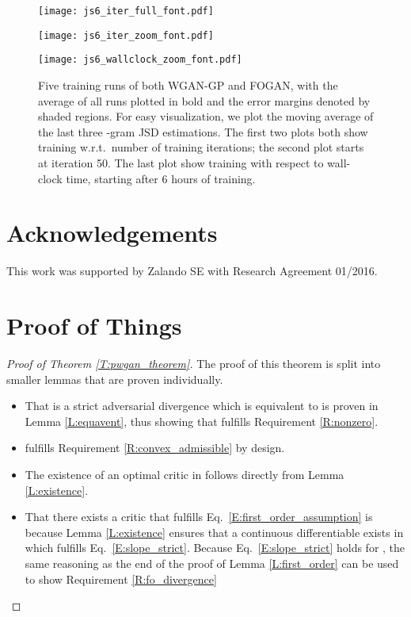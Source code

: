 \documentclass{article}
\begin{document}
 \begin{figure}
\begin{minipage}{\linewidth}
\centering
\texttt{[image: js6\_iter\_full\_font.pdf]}
\end{minipage}
\begin{minipage}{\linewidth}
\centering
\texttt{[image: js6\_iter\_zoom\_font.pdf]}
\end{minipage}
\begin{minipage}{\linewidth}
\centering
\texttt{[image: js6\_wallclock\_zoom\_font.pdf]}
\end{minipage}
\caption{
Five training runs of both WGAN-GP and FOGAN, with the average of all runs plotted in bold and
the  error margins denoted by shaded regions.
For easy visualization, we plot the moving average of the last three -gram JSD estimations.
The first two plots both show training w.r.t.\ number of training iterations; the second plot starts at iteration 50.
The last plot show training with respect to wall-clock time, starting after 6 hours of training.
}\label{F:jsd_6}
\end{figure}
\clearpage

 \section*{Acknowledgements}
 This work was supported by Zalando SE with Research Agreement 01/2016.
 
 
 
 \clearpage{}\appendix
 \onecolumn
 \section{Proof of Things}\label{S:proof_of_things}

\begin{proof}[Proof of Theorem \ref{T:pwgan_theorem}]
 The proof of this theorem is split into smaller lemmas that are proven individually.
 \begin{itemize}
  \item That  is a strict adversarial divergence which is equivalent to  is proven in Lemma \ref{L:equavent},
  thus showing that  fulfills Requirement \ref{R:nonzero}.
  \item  fulfills Requirement \ref{R:convex_admissible} by design.
  \item The existence of an optimal critic in  follows directly from Lemma \ref{L:existence}.
  \item That there exists a critic  that fulfills Eq.\ \ref{E:first_order_assumption} is because
  Lemma \ref{L:existence} ensures that a continuous differentiable  exists in  which
  fulfills Eq.\ \ref{E:slope_strict}. Because Eq.\ \ref{E:slope_strict} holds for ,
  the same reasoning as the end of the proof of Lemma \ref{L:first_order} can be used to show Requirement \ref{R:fo_divergence}
 \end{itemize}
\end{proof}
\end{document}
